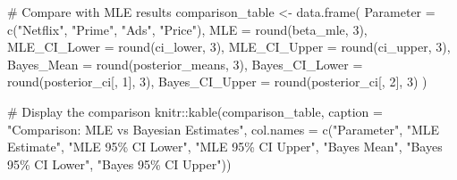 \documentclass[
  letterpaper,
  DIV=11,
  numbers=noendperiod]{scrartcl}
\newenvironment{Shaded}{\begin{snugshade}}{\end{snugshade}}
\newcommand{\AttributeTok}[1]{\textcolor[rgb]{0.40,0.45,0.13}{#1}}
\newcommand{\CommentTok}[1]{\textcolor[rgb]{0.37,0.37,0.37}{#1}}
\newcommand{\DecValTok}[1]{\textcolor[rgb]{0.68,0.00,0.00}{#1}}
\newcommand{\FunctionTok}[1]{\textcolor[rgb]{0.28,0.35,0.67}{#1}}
\newcommand{\NormalTok}[1]{\textcolor[rgb]{0.00,0.23,0.31}{#1}}
\newcommand{\OtherTok}[1]{\textcolor[rgb]{0.00,0.23,0.31}{#1}}
\newcommand{\SpecialCharTok}[1]{\textcolor[rgb]{0.37,0.37,0.37}{#1}}
\newcommand{\StringTok}[1]{\textcolor[rgb]{0.13,0.47,0.30}{#1}}
\begin{document}
\begin{Shaded}
\begin{Highlighting}[]
\CommentTok{\# Compare with MLE results}
\NormalTok{comparison\_table }\OtherTok{\textless{}{-}} \FunctionTok{data.frame}\NormalTok{(}
  \AttributeTok{Parameter =} \FunctionTok{c}\NormalTok{(}\StringTok{"Netflix"}\NormalTok{, }\StringTok{"Prime"}\NormalTok{, }\StringTok{"Ads"}\NormalTok{, }\StringTok{"Price"}\NormalTok{),}
  \AttributeTok{MLE =} \FunctionTok{round}\NormalTok{(beta\_mle, }\DecValTok{3}\NormalTok{),}
  \AttributeTok{MLE\_CI\_Lower =} \FunctionTok{round}\NormalTok{(ci\_lower, }\DecValTok{3}\NormalTok{),}
  \AttributeTok{MLE\_CI\_Upper =} \FunctionTok{round}\NormalTok{(ci\_upper, }\DecValTok{3}\NormalTok{),}
  \AttributeTok{Bayes\_Mean =} \FunctionTok{round}\NormalTok{(posterior\_means, }\DecValTok{3}\NormalTok{),}
  \AttributeTok{Bayes\_CI\_Lower =} \FunctionTok{round}\NormalTok{(posterior\_ci[, }\DecValTok{1}\NormalTok{], }\DecValTok{3}\NormalTok{),}
  \AttributeTok{Bayes\_CI\_Upper =} \FunctionTok{round}\NormalTok{(posterior\_ci[, }\DecValTok{2}\NormalTok{], }\DecValTok{3}\NormalTok{)}
\NormalTok{)}

\CommentTok{\# Display the comparison}
\NormalTok{knitr}\SpecialCharTok{::}\FunctionTok{kable}\NormalTok{(comparison\_table, }
             \AttributeTok{caption =} \StringTok{"Comparison: MLE vs Bayesian Estimates"}\NormalTok{,}
             \AttributeTok{col.names =} \FunctionTok{c}\NormalTok{(}\StringTok{"Parameter"}\NormalTok{, }\StringTok{"MLE Estimate"}\NormalTok{, }\StringTok{"MLE 95\% CI Lower"}\NormalTok{, }\StringTok{"MLE 95\% CI Upper"}\NormalTok{,}
                           \StringTok{"Bayes Mean"}\NormalTok{, }\StringTok{"Bayes 95\% CI Lower"}\NormalTok{, }\StringTok{"Bayes 95\% CI Upper"}\NormalTok{))}
\end{Highlighting}
\end{Shaded}
\end{document}
